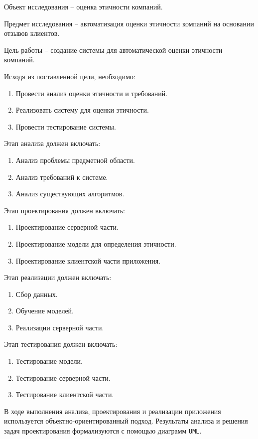 \documentclass[PI, VKR]{HSEUniversity}
\begin{document}
Объект исследования -- оценка этичности компаний.

Предмет исследования -- автоматизация оценки этичности компаний на основании отзывов клиентов.

Цель работы -- создание системы для автоматической оценки этичности компаний.

Исходя из поставленной цели, необходимо:
\begin{enumerate}
\item Провести анализ оценки этичности и требований.
\item Реализовать систему для оценки этичности.
\item Провести тестирование системы.
\end{enumerate}

Этап анализа должен включать:
\begin{enumerate}
\item Анализ проблемы предметной области.
\item Анализ требований к системе.
\item Анализ существующих алгоритмов.
\end{enumerate}

Этап проектирования должен включать:
\begin{enumerate}
\item Проектирование серверной части.
\item Проектирование модели для определения этичности.
\item Проектирование клиентской части приложения.
\end{enumerate}

Этап реализации должен включать:
\begin{enumerate}
\item Сбор данных.
\item Обучение моделей.
\item Реализации серверной части.
\end{enumerate}

Этап тестирования должен включать:
\begin{enumerate}
\item Тестирование модели.
\item Тестирование серверной части.
\item Тестирование клиентской части.
\end{enumerate}

В ходе выполнения анализа, проектирования и реализации приложения используется объектно-ориентированный подход. Результаты анализа и решения задач проектирования формализуются с помощью диаграмм \texttt{UML}.
\end{document}
